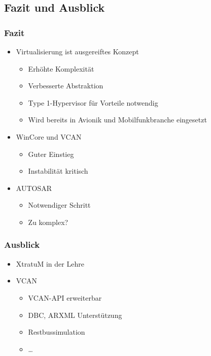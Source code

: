 \documentclass[]{beamer}
\begin{document}
\subsection{Fazit und Ausblick}
\begin{frame}
\frametitle{Fazit}
    \begin{itemize}
        \item Virtualisierung ist ausgereiftes Konzept
        \begin{itemize}
            \item Erhöhte Komplexität
            \item Verbesserte Abstraktion
            \item Type 1-Hypervisor für Vorteile notwendig
            \item Wird bereits in Avionik und Mobilfunkbranche eingesetzt
        \end{itemize}
        \item WinCore und VCAN
        \begin{itemize}
            \item Guter Einstieg
            \item Instabilität kritisch
        \end{itemize}
        \item AUTOSAR
        \begin{itemize}
            \item Notwendiger Schritt
            \item Zu komplex?
        \end{itemize}
    \end{itemize}
\end{frame}

\begin{frame}
\frametitle{Ausblick}
    \begin{itemize}
        \item XtratuM in der Lehre
        \item VCAN
        \begin{itemize}
            \item VCAN-API erweiterbar
            \item DBC, ARXML Unterstützung
            \item Restbussimulation
            \item \dots
        \end{itemize}
    \end{itemize}
\end{frame}
\end{document}
